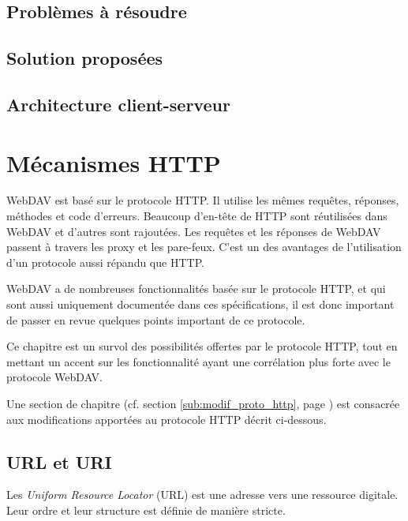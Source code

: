 \documentclass[a4paper, 11pt]{article}
\begin{document}
{	\subsection{Problèmes à résoudre}
	
	
	\subsection{Solution proposées}
	
	
	\subsection{Architecture client-serveur}	
	
	
\section{Mécanismes HTTP}

WebDAV est basé sur le protocole HTTP. Il utilise les mêmes requêtes, réponses, méthodes et code d'erreurs. Beaucoup d'en-tête de HTTP sont réutilisées dans WebDAV et d'autres sont rajoutées. Les requêtes et les réponses de WebDAV passent à travers les proxy et les pare-feux. C'est un des avantages de l'utilisation d'un protocole aussi répandu que HTTP.

WebDAV a de nombreuses fonctionnalités basée sur le protocole HTTP, et qui sont aussi uniquement documentée dans ces spécifications, il est donc important de passer en revue quelques points important de ce protocole. 

Ce chapitre est un survol des possibilités offertes par le protocole HTTP, tout en mettant un accent sur les fonctionnalité ayant une corrélation plus forte avec le protocole WebDAV.

Une section de chapitre (cf. section \ref{sub:modif_proto_http}, page \pageref{sub:modif_proto_http}) est consacrée aux modifications apportées au protocole HTTP décrit ci-dessous.

	\subsection{URL et URI}
	
		Les \emph{Uniform Resource Locator} (URL) est une adresse vers une ressource digitale. Leur ordre et leur structure est définie de manière stricte.
		
}
\end{document}
